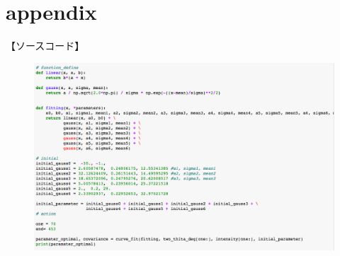 \documentclass[a4paper,12pt]{jarticle}
\begin{document}
\section{appendix}
 【ソースコード】
  \begin{figure}[htbp]
    \begin{center}
     \includegraphics[clip,width=14.0cm]{py_1.png}
     
    \end{center}
  \end{figure}
  
\end{document}

